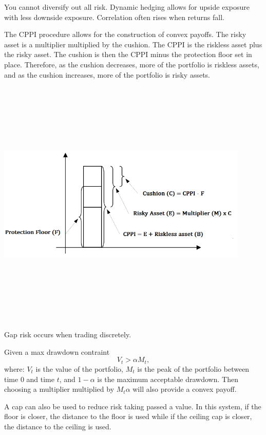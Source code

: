 \documentclass{article}
\begin{document}
You cannot diversify out all risk. Dynamic
hedging allows for upside exposure with 
less downside exposure. Correlation often rises when
returns fall. 

The CPPI procedure allows for the construction 
of convex payoffs. The risky asset is a multiplier multiplied by
the cushion. The CPPI is the riskless asset plus the
risky asset. The cushion is then the CPPI minus the protection
floor set in place. Therefore, as the cushion decreases, more
of the portfolio is riskless assets, and as the cushion increases,
more of the portfolio is risky assets. 

\begin{center}
    \includegraphics[width=12cm,height=12cm, keepaspectratio]{CPPI.png}
\end{center}

\noindent Gap risk occurs when trading discretely.

Given a max drawdown contraint 
\[V_t > \alpha M_t,\] where: $V_t$ is the value of the portfolio,
$M_t$ is the peak of the portfolio between time $0$ and time $t$,
and $1-\alpha$ is the maximum acceptable drawdown. Then choosing
a multiplier multiplied by $M_t \alpha$ will also provide a convex
payoff. 

A cap can also be used to reduce risk taking passed a value. 
In this system, if the floor is closer, the distance to the floor
is used while if the ceiling cap is closer, the distance to the
ceiling is used. 
\end{document}
